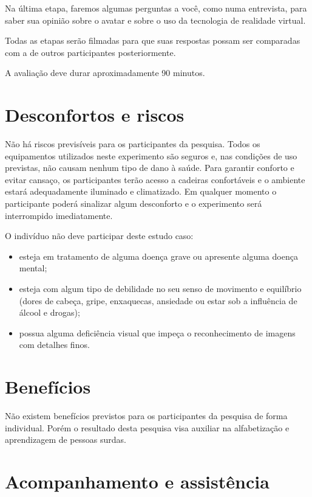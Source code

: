 \documentclass[a4paper,11pt,titlepage,singlespacing]{article}
\begin{document}
Na última etapa, faremos algumas perguntas a você, como numa entrevista, para saber sua opinião sobre o avatar e sobre o uso da tecnologia de realidade virtual.

Todas as etapas serão filmadas para que suas respostas possam ser comparadas com a de outros participantes posteriormente.

A avaliação deve durar aproximadamente 90 minutos.


\section*{Desconfortos e riscos}

\noindent Não há riscos previsíveis para os participantes da pesquisa. Todos os equipamentos utilizados neste experimento são seguros e, nas condições de uso previstas, não causam nenhum tipo de dano à saúde. Para garantir conforto e evitar cansaço, os participantes terão acesso a cadeiras confortáveis e o ambiente estará adequadamente iluminado e climatizado. Em qualquer momento o participante poderá sinalizar algum desconforto e o experimento será interrompido imediatamente.

O indivíduo não deve participar deste estudo caso:

\begin{itemize}
\item esteja em tratamento de alguma doença grave ou apresente alguma doença mental;
\item esteja com algum tipo de debilidade no seu senso de movimento e equilíbrio (dores de cabeça, gripe, enxaquecas, ansiedade ou estar sob a influência de álcool e drogas);
\item possua alguma deficiência visual que impeça o reconhecimento de imagens com detalhes finos.
\end{itemize}

\section*{Benefícios}


Não existem benefícios previstos para os participantes da pesquisa de forma individual. Porém o resultado desta pesquisa visa auxiliar na alfabetização e aprendizagem de pessoas surdas.

\section*{Acompanhamento e assistência}
\end{document}
